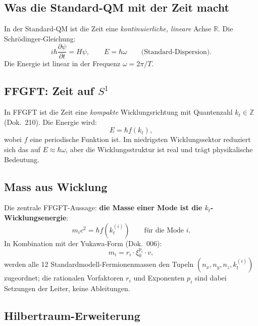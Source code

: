 \subsection{Was die Standard-QM mit der Zeit macht}

In der Standard-QM ist die Zeit eine \emph{kontinuierliche, lineare}
Achse $\mathbb{R}$. Die Schrödinger-Gleichung:
\begin{equation}
  i\hbar \frac{\partial \psi}{\partial t} = H \psi,
  \qquad
  E = \hbar \omega
  \qquad \text{(Standard-Dispersion)}.
\end{equation}
Die Energie ist linear in der Frequenz $\omega = 2\pi/T$.

\subsection{FFGFT: Zeit auf $S^1$}

In FFGFT ist die Zeit eine \emph{kompakte} Wicklungsrichtung mit
Quantenzahl $k_t \in \mathbb{Z}$ (Dok.~210). Die Energie wird:
\begin{equation}
  \boxed{
    E = \hbar f(k_t),
  }
\end{equation}
wobei $f$ eine periodische Funktion ist. Im niedrigsten
Wicklungssektor reduziert sich das auf $E \approx \hbar \omega$, aber
die Wicklungsstruktur ist real und trägt physikalische Bedeutung.

\subsection{Mass aus Wicklung}

Die zentrale FFGFT-Aussage: \textbf{die Masse einer Mode ist die
$k_t$-Wicklungsenergie}:
\begin{equation}
  m_i c^2 = \hbar f(k_t^{(i)})
  \qquad \text{für die Mode $i$}.
\end{equation}
In Kombination mit der Yukawa-Form (Dok.~006):
\begin{equation}
  m_i = r_i \cdot \xi_0^{p_i} \cdot v,
\end{equation}
werden alle 12 Standardmodell-Fermionenmassen den Tupeln
$(n_x, n_y, n_z, k_t^{(i)})$ zugeordnet; die rationalen Vorfaktoren
$r_i$ und Exponenten $p_i$ sind dabei Setzungen der Leiter, keine
Ableitungen.

\subsection{Hilbertraum-Erweiterung}

